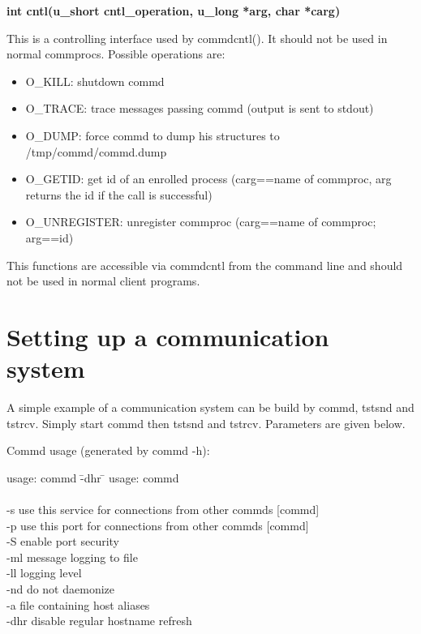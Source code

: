{\bf int cntl(u\_short cntl\_operation, u\_long *arg, char *carg)}
\bigskip

This is a controlling interface used by commdcntl(). It should not be used in
normal commprocs. Possible operations are:

\begin{itemize}
\item O\_KILL: shutdown commd      
\item O\_TRACE: trace messages passing commd (output is sent to
stdout) 
\item O\_DUMP: force commd to dump his structures to /tmp/commd/commd.dump 
\item O\_GETID: get id of an enrolled process (carg==name of commproc,
arg returns the id if the call is successful)
\item O\_UNREGISTER: unregister commproc (carg==name of commproc; arg==id) 
\end{itemize}

This functions are accessible via commdcntl from the command line and
should not be used in normal client programs.


\section{Setting up a communication system}

A simple example of a communication system can be build by commd, tstsnd and
tstrcv. Simply start commd then tstsnd and tstrcv. Parameters are given below.

Commd usage (generated by commd -h):

\begin{tabbing}
usage: commd \=-dhr \= \kill
usage: commd \>[-s service] [-p port] [-S] [-ml fname] [-ll loglevel] [-nd] [-a aliasfile]\\
\>      [-dhr]\\
\>       -s \>use this service for connections from other commds [commd]\\
\>       -p \>use this port for connections from other commds [commd]\\
\>       -S \> enable port security\\
\>       -ml \>message logging to file\\
\>       -ll \>logging level\\
\>       -nd \>do not daemonize\\
\>       -a  \>file containing host aliases\\
\>       -dhr \>disable regular hostname refresh\\
\end{tabbing}

